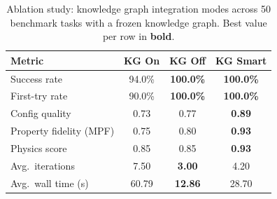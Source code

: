 \begin{table}[htbp]
\centering
\caption{Ablation study: knowledge graph integration modes across 50 benchmark tasks with a frozen knowledge graph.  Best value per row in \textbf{bold}.}
\label{tab:ablation}
\begin{tabular}{lccc}
\toprule
Metric & KG On & KG Off & KG Smart \\
\midrule
  Success rate & 94.0\% & \textbf{100.0\%} & \textbf{100.0\%} \\
  First-try rate & 90.0\% & \textbf{100.0\%} & \textbf{100.0\%} \\
  Config quality & 0.73 & 0.77 & \textbf{0.89} \\
  Property fidelity (MPF) & 0.75 & 0.80 & \textbf{0.93} \\
  Physics score & 0.85 & 0.85 & \textbf{0.93} \\
  Avg.\ iterations & 7.50 & \textbf{3.00} & 4.20 \\
  Avg.\ wall time (s) & 60.79 & \textbf{12.86} & 28.70 \\
\bottomrule
\end{tabular}
\end{table}